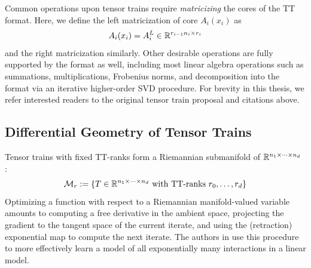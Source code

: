 Common operations upon tensor trains require \textit{matricizing} the cores of the TT format. Here, we define the left matricization of core $A_i(x_i)$ as
\begin{align}\label{eq:TTcoreMatricize}
A_i(x_i) = A_i^L \in \mathbb{R}^{r_{i-1}n_i \times r_i}
\end{align}
and the right matricization similarly.
Other desirable operations are fully supported by the format as well,
including most linear algebra operations such as summations,
multiplications, Frobenius norms,
and decomposition into the format via an iterative higher-order SVD procedure.
For brevity in this thesis, we refer interested readers
to the original tensor train proposal and citations above.

\subsection{Differential Geometry of Tensor Trains}
Tensor trains with fixed TT-ranks form a Riemannian submanifold of $\mathbb{R}^{n_1 \times \cdots \times n_d}$ \citep{lubich2015time, holtz2012manifolds}:
\begin{align}\label{eq:riem}
	\mathcal{M}_r := \{ T \in \mathbb{R}^{n_1 \times \cdots \times n_d} \text{ with TT-ranks\ } r_0,\ldots,r_d\} 
\end{align}
Optimizing a function with respect to a Riemannian manifold-valued variable amounts to computing a free derivative in the ambient space, projecting the gradient to the tangent space of the current iterate, and using the (retraction) exponential map to compute the next iterate.
The authors in \cite{novikov2016exponential} use this procedure to more effectively learn a model of all exponentially many interactions in a linear model.
